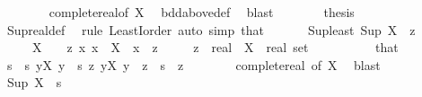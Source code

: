 \begin{isabellebody}
\ \ \ \ \ \ \isamarkupfalse%
\ complete{\isacharunderscore}{\kern0pt}real{\isacharbrackleft}{\kern0pt}of\ X{\isacharbrackright}{\kern0pt}\ \isamarkupfalse%
\ bdd{\isacharunderscore}{\kern0pt}above{\isacharunderscore}{\kern0pt}def\ \isamarkupfalse%
\ blast\isanewline
\ \ \ \ \isamarkupfalse%
\ \isamarkupfalse%
\ {\isacharquery}{\kern0pt}thesis\isanewline
\ \ \ \ \ \ \isamarkupfalse%
\ Sup{\isacharunderscore}{\kern0pt}real{\isacharunderscore}{\kern0pt}def\ \isamarkupfalse%
\ {\isacharparenleft}{\kern0pt}rule\ LeastI{}{\isacharunderscore}{\kern0pt}order{\isacharparenright}{\kern0pt}\ {\isacharparenleft}{\kern0pt}auto\ simp{\isacharcolon}{\kern0pt}\ that{\isacharparenright}{\kern0pt}\isanewline
\ \ \isamarkupfalse%
\isanewline
\ \ \isamarkupfalse%
\ Sup{\isacharunderscore}{\kern0pt}least{\isacharcolon}{\kern0pt}\ {\isachardoublequoteopen}Sup\ X\ {\isasymle}\ z{\isachardoublequoteclose}\isanewline
\ \ \ \ \ {\isachardoublequoteopen}X\ {\isasymnoteq}\ {\isacharbraceleft}{\kern0pt}{\isacharbraceright}{\kern0pt}{\isachardoublequoteclose}\ \ z{\isacharcolon}{\kern0pt}\ {\isachardoublequoteopen}{\isasymAnd}x{\isachardot}{\kern0pt}\ x\ {\isasymin}\ X\ {\isasymLongrightarrow}\ x\ {\isasymle}\ z{\isachardoublequoteclose}\isanewline
\ \ \ \ \ z\ {\isacharcolon}{\kern0pt}{\isacharcolon}{\kern0pt}\ real\ \ X\ {\isacharcolon}{\kern0pt}{\isacharcolon}{\kern0pt}\ {\isachardoublequoteopen}real\ set{\isachardoublequoteclose}\isanewline
\ \ \isamarkupfalse%
\ {\isacharminus}{\kern0pt}\isanewline
\ \ \ \ \isamarkupfalse%
\ that\ \isamarkupfalse%
\ s\ \ s{\isacharcolon}{\kern0pt}\ {\isachardoublequoteopen}{\isasymforall}y{\isasymin}X{\isachardot}{\kern0pt}\ y\ {\isasymle}\ s{\isachardoublequoteclose}\ {\isachardoublequoteopen}{\isasymAnd}z{\isachardot}{\kern0pt}\ {\isasymforall}y{\isasymin}X{\isachardot}{\kern0pt}\ y\ {\isasymle}\ z\ {\isasymLongrightarrow}\ s\ {\isasymle}\ z{\isachardoublequoteclose}\isanewline
\ \ \ \ \ \ \isamarkupfalse%
\ complete{\isacharunderscore}{\kern0pt}real\ {\isacharbrackleft}{\kern0pt}of\ X{\isacharbrackright}{\kern0pt}\ \isamarkupfalse%
\ blast\isanewline
\ \ \ \ \isamarkupfalse%
\ \isamarkupfalse%
\ {\isachardoublequoteopen}Sup\ X\ {\isacharequal}{\kern0pt}\ s{\isachardoublequoteclose}\isanewline

\end{isabellebody}
